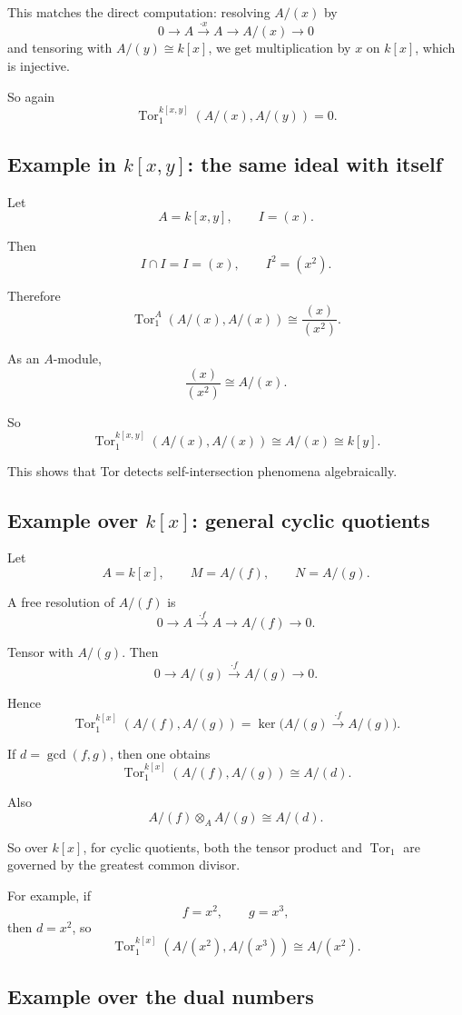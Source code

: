 \documentclass[12pt,a4paper]{article}
\theoremstyle{notespace}
\begin{document}
This matches the direct computation: resolving \(A/(x)\) by
\[
0\to A\xrightarrow{\cdot x}A\to A/(x)\to 0
\]
and tensoring with \(A/(y)\cong k[x]\), we get multiplication by \(x\) on \(k[x]\), which is injective.

So again
\[
\operatorname{Tor}_1^{k[x,y]}(A/(x),A/(y))=0.
\]

\subsection{Example in \(k[x,y]\): the same ideal with itself}

Let
\[
A=k[x,y],
\qquad
I=(x).
\]

Then
\[
I\cap I = I=(x),
\qquad
I^2=(x^2).
\]

Therefore
\[
\operatorname{Tor}_1^A(A/(x),A/(x))
\cong
\frac{(x)}{(x^2)}.
\]

As an \(A\)-module,
\[
\frac{(x)}{(x^2)}\cong A/(x).
\]

So
\[
\operatorname{Tor}_1^{k[x,y]}(A/(x),A/(x))
\cong A/(x)\cong k[y].
\]

This shows that Tor detects self-intersection phenomena algebraically.

\subsection{Example over \(k[x]\): general cyclic quotients}

Let
\[
A=k[x],
\qquad
M=A/(f),
\qquad
N=A/(g).
\]

A free resolution of \(A/(f)\) is
\[
0\to A \xrightarrow{\cdot f} A \to A/(f)\to 0.
\]

Tensor with \(A/(g)\). Then
\[
0\to A/(g)\xrightarrow{\cdot f} A/(g)\to 0.
\]

Hence
\[
\operatorname{Tor}_1^{k[x]}(A/(f),A/(g))
=
\ker\!\bigl(A/(g)\xrightarrow{\cdot f}A/(g)\bigr).
\]

If \(d=\gcd(f,g)\), then one obtains
\[
\operatorname{Tor}_1^{k[x]}(A/(f),A/(g))
\cong
A/(d).
\]

Also
\[
A/(f)\otimes_A A/(g)\cong A/(d).
\]

So over \(k[x]\), for cyclic quotients, both the tensor product and \(\operatorname{Tor}_1\) are governed by the greatest common divisor.

\medskip

For example, if
\[
f=x^2,\qquad g=x^3,
\]
then \(d=x^2\), so
\[
\operatorname{Tor}_1^{k[x]}(A/(x^2),A/(x^3))
\cong
A/(x^2).
\]

\subsection{Example over the dual numbers}
\end{document}
